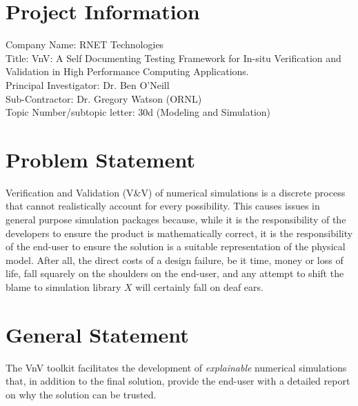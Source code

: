 
\section*{Project Information}
Company Name: RNET Technologies\\
Title: VnV: A Self Documenting Testing Framework for In-situ Verification and Validation in High Performance Computing Applications. \\
Principal Investigator: Dr. Ben O'Neill\\
Sub-Contractor: Dr. Gregory Watson (ORNL) \\
Topic Number/subtopic letter: 30d (Modeling and Simulation)

\section*{Problem Statement}
Verification and Validation (V\&V) of numerical simulations is a discrete process that cannot realistically account for every possibility. This causes issues in general purpose simulation packages because, while it is the responsibility of the developers to ensure the product is mathematically correct, it is the responsibility of the end-user to ensure the solution is a suitable representation of the physical model. After all, the direct costs of a design failure, be it time, money or loss of life, fall squarely on the shoulders on the end-user, and any attempt to shift the blame to simulation library $X$ will certainly fall on deaf ears. 
\section*{General Statement}
The VnV toolkit facilitates the development of \emph{explainable} numerical simulations that, in addition to the final solution, provide the end-user with a detailed report on why the solution can be trusted. 

